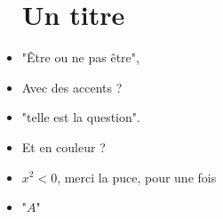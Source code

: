 \begin{itemize}
\section{Un titre}
	\item "Être ou ne pas être",
	\item Avec des accents ?
	\item "telle est la question".
	\item Et en couleur ?
	\item $x^2<0$, merci la puce,
	               pour une fois
	\item "$A$"
\end{itemize}